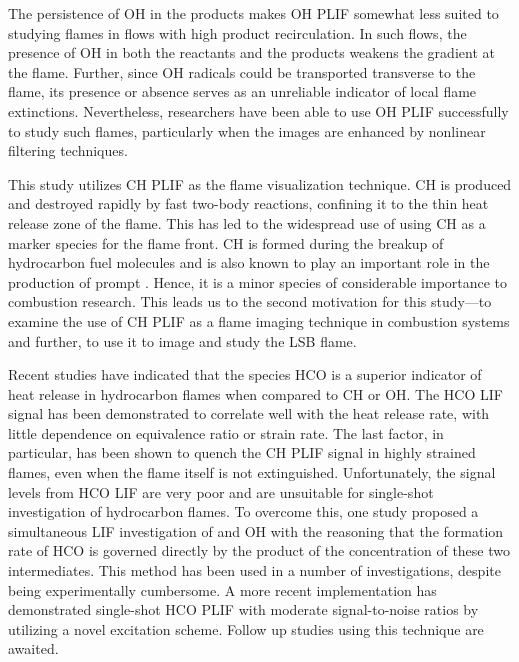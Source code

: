 The persistence of OH in the products makes OH PLIF somewhat less suited to studying flames in flows with high product recirculation.
In such flows, the presence of OH in both the reactants and the products weakens the gradient at the flame.
Further, since OH radicals could be transported transverse to the flame, its presence or absence serves as an unreliable indicator of local flame extinctions.
Nevertheless, researchers have been able to use OH PLIF successfully\cite{1999-kaminski,2005-hult} to study such flames, particularly when the images are enhanced by nonlinear filtering techniques.\cite{2000-malm,2001-abu-gharbieh}

This study utilizes CH PLIF as the flame visualization technique.
CH is produced and destroyed rapidly by fast two-body reactions, confining it to the thin heat release zone of the flame.
This has led to the widespread use of using CH as a marker species for the flame front.\cite{2005-vagelopoulos}
CH is formed during the breakup of hydrocarbon fuel molecules\cite{2010-kohler} and is also known to play an important role in the production of prompt .\cite{1971-fenimore}
Hence, it is a minor species of considerable importance to combustion research.
This leads us to the second motivation for this study---to examine the use of CH PLIF as a flame imaging technique in combustion systems and further, to use it to image and study the LSB flame.

Recent studies\cite{1998-najm} have indicated that the species HCO is a superior indicator of heat release in hydrocarbon flames when compared to CH or OH.
The HCO LIF signal has been demonstrated to correlate well with the heat release rate, with little dependence on equivalence ratio or strain rate.
The last factor, in particular, has been shown to quench the CH PLIF signal\cite{2008-kiefer} in highly strained flames, even when the flame itself is not extinguished.
Unfortunately, the signal levels from HCO LIF are very poor\cite{1998-najm,1998-paul} and are unsuitable for single-shot investigation of hydrocarbon flames.
To overcome this, one study\cite{1998-paul} proposed a simultaneous LIF investigation of  and OH with the reasoning that the formation rate of HCO is governed directly by the product of the concentration of these two intermediates.
This method has been used in a number of investigations, despite being experimentally cumbersome.
A more recent implementation\cite{2009-kiefer} has demonstrated single-shot HCO PLIF with moderate signal-to-noise ratios by utilizing a novel excitation scheme.
Follow up studies using this technique are awaited.

